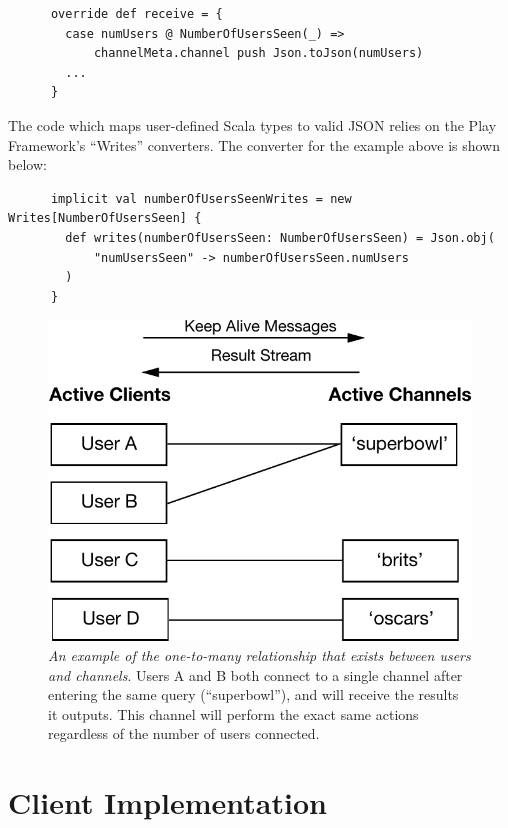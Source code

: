 \documentclass{l4proj}
\begin{document}
    \begin{lstlisting}
      override def receive = {
        case numUsers @ NumberOfUsersSeen(_) => 
            channelMeta.channel push Json.toJson(numUsers)
        ...
      }
    \end{lstlisting}

The code which maps user-defined Scala types to valid JSON relies on the Play Framework's ``Writes'' converters. The converter for the example above is shown below:

    \begin{lstlisting}
      implicit val numberOfUsersSeenWrites = new Writes[NumberOfUsersSeen] {
        def writes(numberOfUsersSeen: NumberOfUsersSeen) = Json.obj(
            "numUsersSeen" -> numberOfUsersSeen.numUsers
        )
      }
    \end{lstlisting}

    
        
\begin{figure}
\centering
\includegraphics[scale=0.75]{channels.pdf}
\caption{\textit{An example of the one-to-many relationship that exists between users and channels}. Users A and B both connect to a single channel after entering the same query (``superbowl''), and will receive the results it outputs. This channel will perform the exact same actions regardless of the number of users connected.}
\label{channels}
\end{figure}        
                          
\section{Client Implementation}
\end{document}
